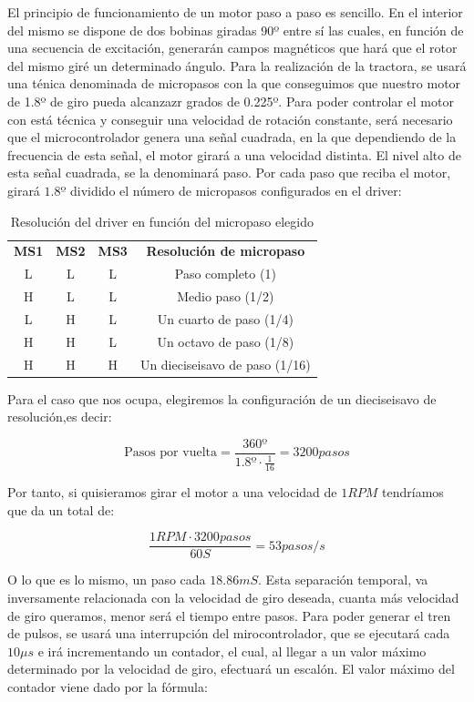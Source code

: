 El principio de funcionamiento de un motor paso a paso es sencillo. En el interior del mismo se dispone de dos bobinas giradas 90º entre sí \cite{pasoapaso} las cuales, en función de una secuencia de excitación, generarán campos magnéticos que hará que el rotor del mismo giré un determinado ángulo. Para la realización de la tractora, se usará una ténica denominada de micropasos con la que conseguimos que nuestro motor de 1.8º de giro pueda alcanzazr grados de 0.225º. Para poder controlar el motor con está técnica y conseguir una velocidad de rotación constante, será necesario que el microcontrolador genera una señal cuadrada, en la que dependiendo de la frecuencia de esta señal, el motor girará a una velocidad distinta. El nivel alto de esta señal cuadrada, se la denominará paso. Por cada paso que reciba el motor, girará $1.8º$ dividido el número de micropasos configurados en el driver:

\begin{table}[H]
\centering
\begin{tabular}{cccc}
{\bf MS1} & {\bf MS2} & {\bf MS3} & {\bf Resolución de micropaso}  \\
L         & L         & L         & Paso completo (1)              \\
H         & L         & L         & Medio paso (1/2)               \\
L         & H         & L         & Un cuarto de paso (1/4)        \\
H         & H         & L         & Un octavo de paso (1/8)        \\
H         & H         & H         & Un dieciseisavo de paso (1/16)
\end{tabular}
\caption{Resolución del driver en función del micropaso elegido}
\label{tab:res_drive}
\end{table}

Para el caso que nos ocupa, elegiremos la configuración de un dieciseisavo de resolución,es decir:

$$ \text{Pasos por vuelta} = \frac{360º}{1.8º \cdot \frac{1}{16}} = 3200 pasos  $$

Por tanto, si quisieramos girar el motor a una velocidad de $1RPM$ tendríamos que da un total de:

$$\frac{1 RPM \cdot 3200 pasos}{60 S} = 53 pasos/s$$

O lo que es lo mismo, un paso cada $18.86 mS$. Esta separación temporal, va inversamente relacionada con la velocidad de giro deseada, cuanta más velocidad de giro queramos, menor será el tiempo entre pasos. Para poder generar el tren de pulsos, se usará una interrupción del mirocontrolador, que se ejecutará cada $10\mu s$ e irá incrementando un contador, el cual, al llegar a un valor máximo determinado por la velocidad de giro, efectuará un escalón. El valor máximo del contador viene dado por la fórmula:


